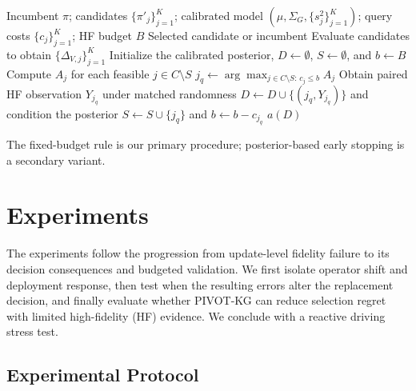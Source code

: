 \documentclass{article}
\begin{document}
\begin{algorithm}[H]
\caption{PIVOT-KG under a fixed high-fidelity budget}
\label{alg:pivot-kg}
\begin{algorithmic}[1]
\REQUIRE Incumbent $\pi$; candidates $\{\pi'_j\}_{j=1}^K$;
calibrated model $(\mu,\Sigma_G,\{s_j^2\}_{j=1}^K)$;
query costs $\{c_j\}_{j=1}^K$; HF budget $B$
\ENSURE Selected candidate or incumbent
\STATE Evaluate candidates to obtain $\{\Delta_{V,j}\}_{j=1}^K$
\STATE Initialize the calibrated posterior,
$D\leftarrow\emptyset$, $S\leftarrow\emptyset$, and $b\leftarrow B$
  \STATE Compute $A_j$ for each feasible $j\in C\setminus S$
  \STATE
  $j_q\leftarrow
  \arg\max_{j\in C\setminus S:\,c_j\leq b} A_j$
  \STATE Obtain paired HF observation $Y_{j_q}$ under matched randomness
  \STATE $D\leftarrow D\cup\{(j_q,Y_{j_q})\}$ and condition the posterior
  \STATE $S\leftarrow S\cup\{j_q\}$ and $b\leftarrow b-c_{j_q}$
\ENDWHILE
\RETURN $a(D)$
\end{algorithmic}
\end{algorithm}

The fixed-budget rule is our primary procedure; posterior-based early stopping
is a secondary variant.


\section{Experiments}

The experiments follow the progression from update-level fidelity failure to
its decision consequences and budgeted validation. We first isolate operator
shift and deployment response, then test when the resulting errors alter the
replacement decision, and finally evaluate whether PIVOT-KG can reduce
selection regret with limited high-fidelity (HF) evidence. We conclude with a
reactive driving stress test.

\subsection{Experimental Protocol}
\label{sec:exp-protocol}
\end{document}
